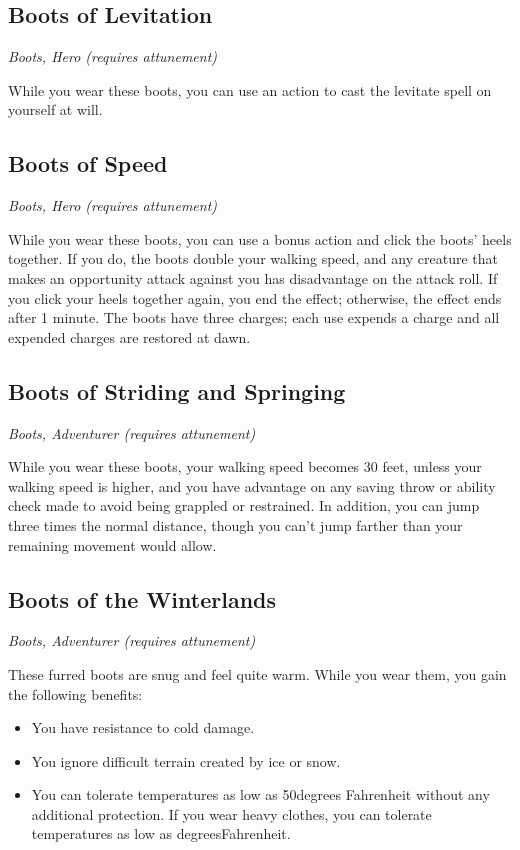 \subsection{Boots of Levitation}
\textit{Boots, Hero (requires attunement)}

While you wear these boots, you can use an action to cast the levitate spell on yourself at will.

\subsection{Boots of Speed}
\textit{Boots, Hero (requires attunement)}

While you wear these boots, you can use a bonus action and click the boots' heels together. If you do, the boots double your walking speed, and any creature that makes an opportunity attack against you has disadvantage on the attack roll. If you click your heels together again, you end the effect; otherwise, the effect ends after 1 minute. The boots have three charges; each use expends a charge and all expended charges are restored at dawn.

\subsection{Boots of Striding and Springing}
\textit{Boots, Adventurer (requires attunement)} 

While you wear these boots, your walking speed becomes 30 feet, unless your walking speed is higher, and you have advantage on any saving throw or ability check made to avoid being grappled or restrained. In addition, you can jump three times the normal distance, though you can't jump farther than your remaining movement would allow.

\subsection{Boots of the Winterlands}
\textit{Boots, Adventurer (requires attunement)}

These furred boots are snug and feel quite warm. While you wear them, you gain the following benefits:
\begin{itemize}
 \item You have resistance to cold damage.
 \item You ignore difficult terrain created by ice or snow.
 \item You can tolerate temperatures as low as \textminus50degrees Fahrenheit without any additional protection. If you wear heavy clothes, you can tolerate temperatures as low as  degreesFahrenheit.
\end{itemize}

